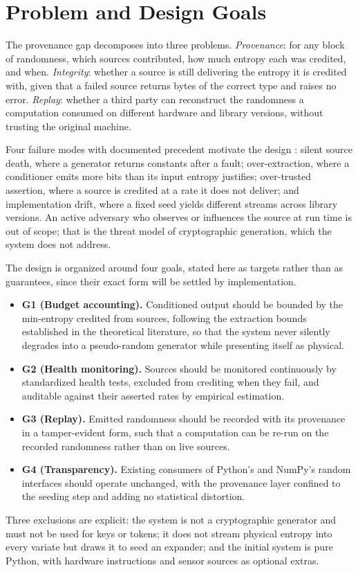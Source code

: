 \section{Problem and Design Goals}
 
The provenance gap decomposes into three problems. \emph{Provenance}: for any block of
randomness, which sources contributed, how much entropy each was credited, and when.
\emph{Integrity}: whether a source is still delivering the entropy it is credited with,
given that a failed source returns bytes of the correct type and raises no error.
\emph{Replay}: whether a third party can reconstruct the randomness a computation
consumed on different hardware and library versions, without trusting the original
machine.
 
Four failure modes with documented precedent motivate the design \citep{turan2018}:
silent source death, where a generator returns constants after a fault; over-extraction,
where a conditioner emits more bits than its input entropy justifies; over-trusted
assertion, where a source is credited at a rate it does not deliver; and implementation
drift, where a fixed seed yields different streams across library versions. An active
adversary who observes or influences the source at run time is out of scope; that is the
threat model of cryptographic generation, which the system does not address.
 
The design is organized around four goals, stated here as targets rather than as
guarantees, since their exact form will be settled by implementation.
 
\begin{itemize}
  \item \textbf{G1 (Budget accounting).} Conditioned output should be bounded by the
        min-entropy credited from sources, following the extraction bounds established
        in the theoretical literature, so that the system never silently degrades into a
        pseudo-random generator while presenting itself as physical.
  \item \textbf{G2 (Health monitoring).} Sources should be monitored continuously by
        standardized health tests, excluded from crediting when they fail, and auditable
        against their asserted rates by empirical estimation.
  \item \textbf{G3 (Replay).} Emitted randomness should be recorded with its provenance
        in a tamper-evident form, such that a computation can be re-run on the recorded
        randomness rather than on live sources.
  \item \textbf{G4 (Transparency).} Existing consumers of Python's and NumPy's random
        interfaces should operate unchanged, with the provenance layer confined to the
        seeding step and adding no statistical distortion.
\end{itemize}
 
Three exclusions are explicit: the system is not a cryptographic generator and must not
be used for keys or tokens; it does not stream physical entropy into every variate but
draws it to seed an expander; and the initial system is pure Python, with hardware
instructions and sensor sources as optional extras.
 
